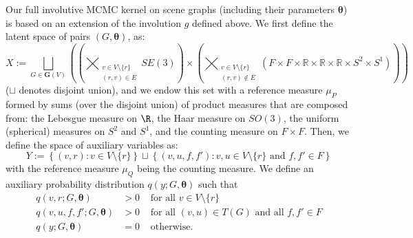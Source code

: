 Our full involutive MCMC kernel on scene graphs (including their parameters $\bm\theta$) is based on an extension of the involution $g$ defined above.
We first define the latent space of pairs $(G, \bm\theta)$, as:
\begin{equation}
X := \bigsqcup_{G \in \mathbf{G}(V)} \left(
\left(
    \bigtimes_{\substack{v \in V\setminus \{r\}\\(r, v) \in E}} SE(3)
\right)
\times
\left(
\bigtimes_{\substack{v \in V \setminus \{r\}\\(r, v) \not \in E}} (F \times F \times \mathbb{R} \times \mathbb{R} \times \mathbb{R} \times S^2 \times S^1)
\right)
\right)
\end{equation}
($\sqcup$ denotes disjoint union), and we endow this set with
a reference measure $\mu_P$ formed by sums (over the disjoint union)
of product measures that are composed from: the Lebesgue measure on $\R$,
the Haar measure on $SO(3)$, the uniform (spherical) measures on $S^2$ and $S^1$,
and the counting measure on $F \times F$.
Then, we define the space of auxiliary variables as:
\begin{equation}
Y := 
\left\{
    (v, r) : v \in V \setminus\{r\}
\right\}
\sqcup
\left\{
(v, u, f, f') : v,u \in V \setminus\{r\} \text{ and } f, f' \in F
\right\}
\end{equation}
with the reference measure $\mu_Q$ being the counting measure.
We define an auxiliary probability distribution $q(y; G, \bm\theta)$ such that
\begin{equation}
\begin{array}{lll}
q(v, r; G, \bm\theta) &> 0 &\mbox{ for all } v \in V \setminus \{r\}\\
q(v, u, f, f'; G, \bm\theta) &> 0 &\mbox { for all } (v, u) \in T(G) \mbox{ and all } f, f' \in F\\
q(y; G, \bm\theta) &= 0 &\mbox{ otherwise.}
\end{array}
\end{equation}

